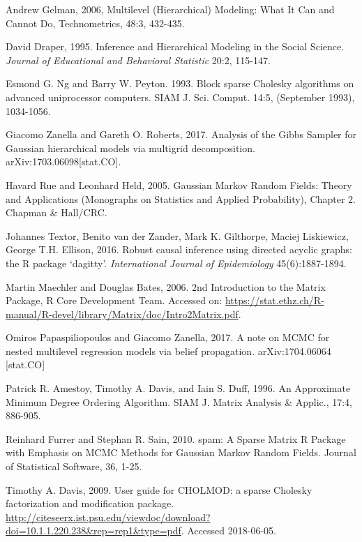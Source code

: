 \documentclass[]{article}
\begin{document}
Andrew Gelman, 2006, Multilevel (Hierarchical) Modeling: What It Can and
Cannot Do, Technometrics, 48:3, 432-435.

David Draper, 1995. Inference and Hierarchical Modeling in the Social
Science. \emph{Journal of Educational and Behavioral Statistic} 20:2,
115-147.

Esmond G. Ng and Barry W. Peyton. 1993. Block sparse Cholesky algorithms
on advanced uniprocessor computers. SIAM J. Sci. Comput. 14:5,
(September 1993), 1034-1056.

Giacomo Zanella and Gareth O. Roberts, 2017. Analysis of the Gibbs
Sampler for Gaussian hierarchical models via multigrid decomposition.
arXiv:1703.06098{[}stat.CO{]}.

Havard Rue and Leonhard Held, 2005. Gaussian Markov Random Fields:
Theory and Applications (Monographs on Statistics and Applied
Probability), Chapter 2. Chapman \& Hall/CRC.

Johannes Textor, Benito van der Zander, Mark K. Gilthorpe, Maciej
Liskiewicz, George T.H. Ellison, 2016. Robust causal inference using
directed acyclic graphs: the R package `dagitty'. \emph{International
Journal of Epidemiology} 45(6):1887-1894.

Martin Maechler and Douglas Bates, 2006. 2nd Introduction to the Matrix
Package, R Core Development Team. Accessed on:
\url{https://stat.ethz.ch/R-manual/R-devel/library/Matrix/doc/Intro2Matrix.pdf}.

Omiros Papaspiliopoulos and Giacomo Zanella, 2017. A note on MCMC for
nested multilevel regression models via belief propagation.
arXiv:1704.06064 {[}stat.CO{]}

Patrick R. Amestoy, Timothy A. Davis, and Iain S. Duff, 1996. An
Approximate Minimum Degree Ordering Algorithm. SIAM J. Matrix Analysis
\& Applic., 17:4, 886-905.

Reinhard Furrer and Stephan R. Sain, 2010. spam: A Sparse Matrix R
Package with Emphasis on MCMC Methods for Gaussian Markov Random Fields.
Journal of Statistical Software, 36, 1-25.

Timothy A. Davis, 2009. User guide for CHOLMOD: a sparse Cholesky
factorization and modification package.
\url{http://citeseerx.ist.psu.edu/viewdoc/download?doi=10.1.1.220.238\&rep=rep1\&type=pdf}.
Accessed 2018-06-05.
\end{document}
